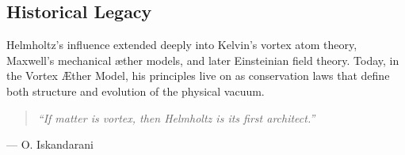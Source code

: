     \subsection*{Historical Legacy}

    Helmholtz's influence extended deeply into Kelvin’s vortex atom theory, Maxwell’s mechanical æther models, and later Einsteinian field theory. Today, in the Vortex Æther Model, his principles live on as conservation laws that define both structure and evolution of the physical vacuum.

    \begin{quote}
    \textit{“If matter is vortex, then Helmholtz is its first architect.”}
    \end{quote}
   \hfill — O. Iskandarani